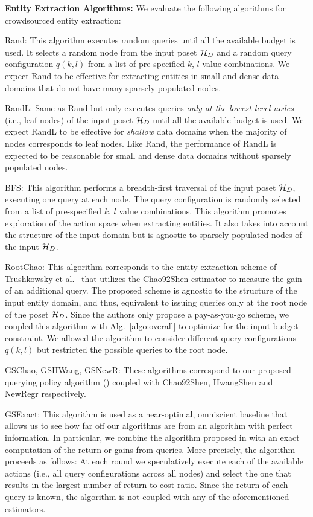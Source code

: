\vspace{5pt}\noindent\textbf{Entity Extraction Algorithms:} We evaluate the following algorithms for crowdsourced entity extraction:
\squishlist
\item Rand: This algorithm executes random queries until all the available budget is used. It selects a random node from the input poset $\mathcal{H}_D$ and a random query configuration $q(k,l)$ from a list of pre-specified $k$, $l$ value combinations. \iftr We expect Rand to be effective for extracting entities in small and dense data domains that do not have many sparsely populated nodes. \fi
\item RandL: Same as Rand but only executes queries {\em only at the lowest level nodes} (i.e., leaf nodes) of the input poset $\mathcal{H}_D$ until all the available budget is used.  \iftr We expect RandL to be effective for {\em shallow} data domains when the majority of nodes corresponds to leaf nodes. Like Rand, the performance of RandL is expected to be reasonable for small and dense data domains without sparsely populated nodes.\fi
\item BFS: This algorithm performs a breadth-first traversal of the input poset $\mathcal{H}_D$, executing one query at each node. The query configuration is randomly selected from a list of pre-specified $k$, $l$ value combinations. This algorithm promotes exploration of the action space when extracting entities. \iftr It also takes into account the structure of the input domain but is agnostic to sparsely populated nodes of the input $\mathcal{H}_D$. \fi
\item RootChao: This algorithm corresponds to the entity extraction scheme of Trushkowsky et al.~\cite{trushkowsky:2013} that utilizes the Chao92Shen estimator to measure the gain of an additional query. The proposed scheme is agnostic to the structure of the input entity domain, and thus, equivalent to issuing queries only at the root node of the poset $\mathcal{H}_D$. Since the authors only propose a pay-as-you-go scheme, we coupled this algorithm with Alg.~\ref{algo:overall} to optimize for the input budget constraint. We allowed the algorithm to consider different query configurations $q(k,l)$ but restricted the possible queries to the root node.
\item GSChao, GSHWang, GSNewR: These algorithms correspond to our proposed querying policy algorithm () coupled with Chao92Shen, HwangShen and NewRegr respectively.
\item GSExact: This algorithm is used as a near-optimal, omniscient baseline that allows us to see how far off our algorithms are from an algorithm with perfect information. In particular, we combine the algorithm proposed in  with an exact computation of the return or gains from queries. More precisely, the algorithm proceeds as follows: At each round we speculatively execute each of the available actions (i.e., all query configurations across all nodes) and select the one that results in the largest number of return to cost ratio. Since the return of each query is known, the algorithm is not coupled with any of the aforementioned estimators.
\squishend


